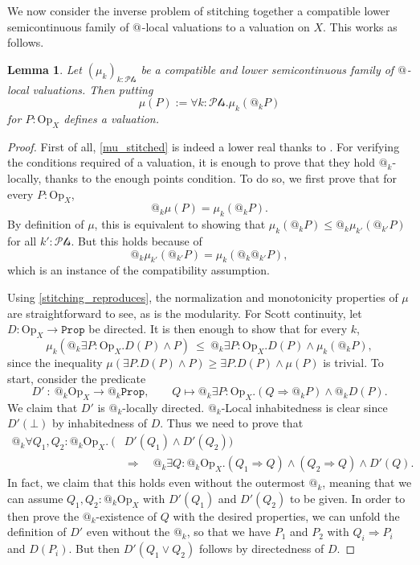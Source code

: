 \documentclass[11pt, oneside, article]{memoir}
\makeatletter
\theoremstyle{plain}
\newtheorem{lemma}[theorem]{Lemma}
\theoremstyle{definition}
\theoremstyle{remark}
\newcommand{\const}[1]{\mathtt{#1}}
\newcommand{\Set}[1]{\mathrm{#1}}
\newcommand{\prop}{\const{Prop}}
\newcommand{\Op}{\Set{Op}}
\newcommand{\pt}{k}				%
\newcommand{\Pts}{\mathcal{Pts}}		%
\newcommand{\AtSymbol}{{@}}
\newcommand{\At}[1][\pt]{\AtSymbol_{#1}}
\newcommand{\imp}{\Rightarrow}
\makeatother
\begin{document}
We now consider the inverse problem of stitching together a compatible lower semicontinuous family of $\At[]$-local valuations to a valuation on $X$. This works as follows.

\begin{lemma}
	Let $(\mu_\pt)_{\pt : \Pts}$ be a compatible and lower semicontinuous family of $\At[]$-local valuations. Then putting
	\begin{equation}
		\label{mu_stitched}
		\mu(P) := \forall \pt : \Pts . \mu_\pt(\At P)
	\end{equation}
	for $P : \Op_X$ defines a valuation.
\end{lemma}

\begin{proof}
	First of all, \eqref{mu_stitched} is indeed a lower real thanks to . For verifying the conditions required of a valuation, it is enough to prove that they hold $\At$-locally, thanks to the enough points condition. To do so, we first prove that for every $P : \Op_X$,
	\begin{equation}
		\label{stitching_reproduces}
		\At \mu(P) = \mu_\pt(\At P).
	\end{equation}
	By definition of $\mu$, this is equivalent to showing that $\mu_\pt(\At P) \le \At \mu_{\pt'}(\At[\pt'] P)$ for all $\pt' : \Pts$. But this holds because of
	\[
		\At \mu_{\pt'}(\At[\pt'] P) = \mu_\pt(\At \At[\pt'] P),
	\]
	which is an instance of the compatibility assumption.

	Using \eqref{stitching_reproduces}, the normalization and monotonicity properties of $\mu$ are straightforward to see, as is the modularity. For Scott continuity, let $D : \Op_X \to \prop$ be directed. It is then enough to show that for every $\pt$,
	\begin{equation}
		\label{goal_continuous}
		\mu_\pt(\At \exists P : \Op_X . D(P) \land P) \: \le \: \At \exists P : \Op_X . D(P) \land \mu_\pt(\At P),
	\end{equation}
	since the inequality $\mu(\exists P . D(P) \land P) \ge \exists P . D(P) \land \mu(P)$ is trivial. To start, consider the predicate
	\[
		D' \: : \: \At \Op_X \longrightarrow \At \prop, \qquad Q \longmapsto \At \exists P : \Op_X . (Q \imp \At P) \land \At D(P).
	\]
	We claim that $D'$ is $\At$-locally directed. $\At$-Local inhabitedness is clear since $D'(\bot)$ by inhabitedness of $D$. Thus we need to prove that
	\begin{align*}
		\At \forall Q_1, Q_2 : \At \Op_X . \: ( & D'(Q_1) \land D'(Q_2))					\\
			& \Longrightarrow \quad \At \exists Q : \At \Op_X . (Q_1 \imp Q) \land (Q_2 \imp Q) \land D'(Q).
	\end{align*}
	In fact, we claim that this holds even without the outermost $\At$, meaning that we can assume $Q_1, Q_2 : \At \Op_X$ with $D'(Q_1)$ and $D'(Q_2)$ to be given. In order to then prove the $\At$-existence of $Q$ with the desired properties, we can unfold the definition of $D'$ even without the $\At$, so that we have $P_1$ and $P_2$ with $Q_i \imp P_i$ and $D(P_i)$. But then $D'(Q_1 \lor Q_2)$ follows by directedness of $D$.


\end{proof}
\end{document}
